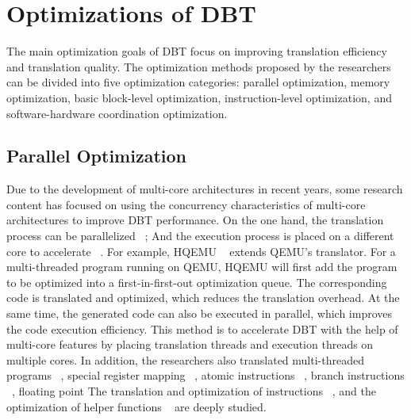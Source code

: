 \section{Optimizations of DBT}
\label{sec:optimizations}

The main optimization goals of DBT focus on improving translation efficiency and translation quality.
The optimization methods proposed by the researchers can be divided into five optimization categories: parallel optimization, memory optimization, basic block-level optimization, instruction-level optimization, and software-hardware coordination optimization.

\subsection{Parallel Optimization}
Due to the development of multi-core architectures in recent years, some research content has focused on using the concurrency characteristics of multi-core architectures to improve DBT performance.
On the one hand, the translation process can be parallelized ~\cite{Qin2006AMA}\cite{Bhm2011GeneralizedJT}; And the execution process is placed on a different core to accelerate ~\cite{Xu2010ADB}\cite{Guan2011MTCrossBitAD}\cite{Spink2015EfficientDS}.
For example, HQEMU ~\cite{Hong2012HQEMUAM}\cite{Hong2014EfficientAR} extends QEMU's translator.
For a multi-threaded program running on QEMU, HQEMU will first add the program to be optimized into a first-in-first-out optimization queue.
The corresponding code is translated and optimized, which reduces the translation overhead.
At the same time, the generated code can also be executed in parallel, which improves the code execution efficiency.
This method is to accelerate DBT with the help of multi-core features by placing translation threads and execution threads on multiple cores.
In addition, the researchers also translated multi-threaded programs ~\cite{Chung2008ThreadsafeDB}, special register mapping ~\cite{MaXiangning2005}\cite{WenYanhua2009}\cite{WangWenwen2014}, atomic instructions ~\cite{Kristien2020FastAC}\cite{Zhao2021EnhancingAI}, branch instructions ~\cite{Jia2013SPIREID}\cite{DAntras2016OptimizingIB}, floating point The translation and optimization of instructions ~\cite{XieHaibin2014}, and the optimization of helper functions ~\cite{Wang2021HelperFI} are deeply studied.

